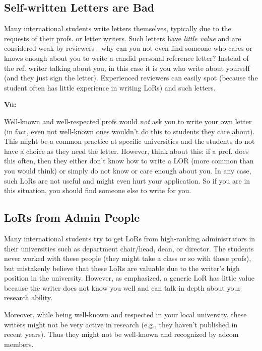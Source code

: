 \documentclass[oneside,11pt,dvipsnames]{book}
\newenvironment{commentbox}[1][]{
  \small
  \begin{mybox}
    {\small \textbf{#1}}
  }{
  \end{mybox}
}
\newcommand{\red}[1]{{\color{red}{#1}}}
\begin{document}
\subsection{Self-written Letters are Bad}\label{sec:self-letters}
 Many international students write letters themselves, typically due to the requests of their profs. or letter writers. Such letters have \emph{little value} and are considered weak by reviewers---why can you not even find someone who cares or knows enough about you to write a candid personal reference letter?  Instead of the ref. writer talking about you, in this case it is you who write about yourself (and they just sign the letter). Experienced reviewers can easily spot  (because the student often has little experience in writing LoRs) and  \red{red flag} such letters.

\begin{commentbox}[Vu:]
 Well-known and well-respected profs would \emph{not} ask you to write your own letter (in fact, even not well-known ones wouldn't do this to students they care about). This might be a common practice at specific universities and the students do not have a choice as they need the letter.  However, think about this: if a prof. does this often, then they either don't know how to write a LOR (more common than you would think) or simply do not know or care enough about you.  In any case, such LoRs are not useful and might even hurt your application.  So if you are in this situation, you should find someone else to write for you.
\end{commentbox}

\subsection{LoRs from Admin People}\label{sec:admin-letters}

Many international students try to get LoRs from high-ranking administrators in their universities such as department chair/head, dean, or director. The students never worked with these people (they might take a class or so with these profs), but mistakenly believe that these LoRs are valuable due to the writer's high position in the university.
However, as emphasized, a generic LoR has little value because the writer does not know you well and can talk in depth about your research ability. 

Moreover, while being well-known and respected in your local university, these writers might not be very active in research (e.g., they haven't published in recent years). Thus they might not be well-known and recognized by adcom members.  
\end{document}
